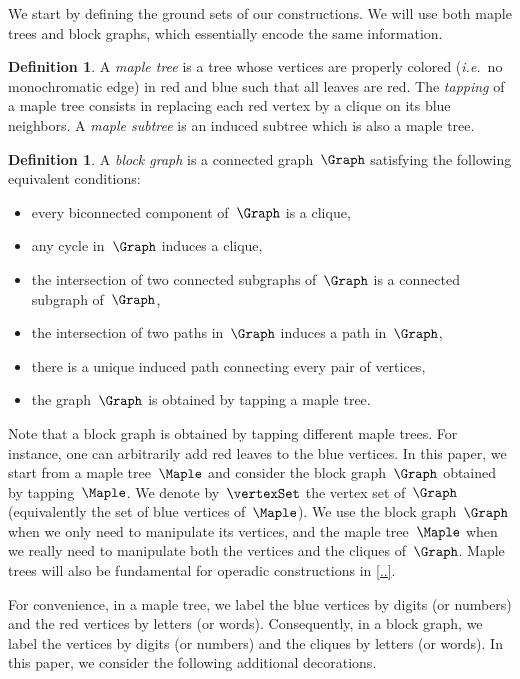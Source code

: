 \documentclass{amsart}
\theoremstyle{definition}
\newtheorem{definition}[theorem]{Definition}
\newcommand{\ie}{\textit{i.e.}~} %
\newcommand{\darkblue}{\color{darkblue}} %
\newcommand{\defn}[1]{\textsl{\darkblue #1}} %
\newcommand{\vincent}[1]{\todo[color=blue!30]{#1 \\ \hfill --- V.}}
\begin{document}
We start by defining the ground sets of our constructions.
We will use both maple trees and block graphs, which essentially encode the same information.

\begin{definition}
  A \defn{maple tree} is a tree whose vertices are properly colored (\ie no monochromatic edge) in red and blue such that all leaves are red.
  \vincent{should blue be gray?}
  The \defn{tapping} of a maple tree consists in replacing each red vertex by a clique on its blue neighbors.
  A \defn{maple subtree} is an induced subtree which is also a maple tree.
\end{definition}

\begin{definition}
  \label{def:blockgraph}
  A \defn{block graph} is a connected graph~$\Graph$ satisfying the following equivalent conditions:
  \begin{itemize}
    \item every biconnected component of~$\Graph$ is a clique,
    \item any cycle in~$\Graph$ induces a clique,
    \item the intersection of two connected subgraphs of~$\Graph$ is a connected subgraph of~$\Graph$,
    \item the intersection of two paths in~$\Graph$ induces a path in~$\Graph$,
    \item there is a unique induced path connecting every pair of vertices,
    \item the graph~$\Graph$ is obtained by tapping a maple tree.
  \end{itemize}
\end{definition}

Note that a block graph is obtained by tapping different maple trees. For instance, one can arbitrarily add red leaves to the blue vertices.
In this paper, we start from a maple tree~$\Maple$ and consider the block graph~$\Graph$ obtained by tapping~$\Maple$.
We denote by~$\vertexSet$ the vertex set of~$\Graph$ (equivalently the set of blue vertices of~$\Maple$).
We use the block graph~$\Graph$ when we only need to manipulate its vertices, and the maple tree~$\Maple$ when we really need to manipulate both the vertices and the cliques of~$\Graph$.
Maple trees will also be fundamental for operadic constructions in \cref{..}.

For convenience, in a maple tree, we label the blue vertices by digits (or numbers) and the red vertices by letters (or words).
Consequently, in a block graph, we label the vertices by digits (or numbers) and the cliques by letters (or words).
In this paper, we consider the following additional decorations.
\end{document}
